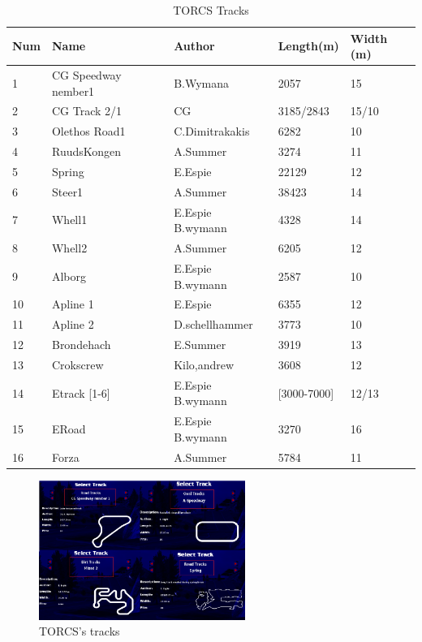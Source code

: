 \documentclass{llncs}
\begin{document}
\begin{table}[h!]
	
	\caption{TORCS Tracks }
	\label{CATRA}			
	\begin{tabular}{ |p{1cm}|p{3cm}|p{3 cm}|p{2 cm}|p{2 cm}|}
		{ \textbf{Num} }&	
		{ \textbf{Name} }&
		{ \textbf{Author}}&  
		{ \textbf{Length(m)} } &
		{ \textbf{Width (m)} }
		\\
		\hline
		1 & CG Speedway nember1 & B.Wymana & 2057 & 15 
		\\
		\hline
		2 & CG Track 2/1 & CG & 3185/2843 & 15/10 
		\\
		\hline
		3 & Olethos Road1 & C.Dimitrakakis & 6282 & 10 
		\\
		\hline
		4 & RuudsKongen & A.Summer & 3274 & 11
		\\
		\hline
		5 & Spring & E.Espie & 22129 & 12
		\\
		\hline
		6 & Steer1 & A.Summer & 38423 & 14
		\\
		\hline
		7 & Whell1 & E.Espie B.wymann & 4328 & 14
		\\
		\hline	
		8 & Whell2 & A.Summer & 6205 & 12
		\\
		\hline	
		9 & Alborg & E.Espie B.wymann & 2587 & 10
		\\
		\hline
		10 & Apline 1 & E.Espie  & 6355 & 12
		\\
		\hline
		11 & Apline 2 & D.schellhammer & 3773 & 10
		\\
		\hline
		12 & Brondehach & E.Summer & 3919 & 13
		\\
		\hline
		13 & Crokscrew & Kilo,andrew & 3608 & 12
		\\
		\hline
		14 & Etrack [1-6] & E.Espie B.wymann& [3000-7000] & 12/13
		\\
		\hline
		15 & ERoad  & E.Espie B.wymann & 3270 & 16
		\\
		\hline	
		16 & Forza  & A.Summer & 5784 & 11
		\\
		\hline   		    	
	\end{tabular} 
	
\end{table}

\begin{figure}[ h!]
	\centering
	\includegraphics[width=0.6\textwidth]{fig/trackexp.png}
	\begin{minipage}{10cm}
		\centering
		\caption{\footnotesize TORCS's tracks}
		\label{trackexp}
	\end{minipage} 
 
	
\end{figure}
\newpage
\end{document}

